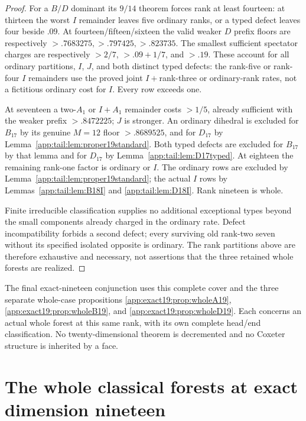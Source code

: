 \documentclass[11pt]{article}
\theoremstyle{definition}
\theoremstyle{remark}
\begin{document}
\begin{proof}
For a $B/D$ dominant its $9/14$ theorem forces rank at least
fourteen: at thirteen the worst $I$ remainder leaves five
ordinary ranks, or a typed defect leaves four beside $.09$.
At fourteen/fifteen/sixteen the valid weaker $D$ prefix
floors are respectively
$>.7683275,>.797425,>.823735$.
The smallest sufficient spectator charges are respectively
$>2/7$, $>.09+1/7$, and $>.19$.
These account for all ordinary partitions, $I$, $J$, and
both distinct typed defects: the rank-five or rank-four
$I$ remainders use the proved joint $I+$rank-three or
ordinary-rank rates, not a fictitious ordinary cost for $I$.
Every row exceeds one.

At seventeen a two-$A_1$ or $I+A_1$ remainder costs $>1/5$,
already sufficient with the weaker prefix $>.8472225$;
$J$ is stronger. An ordinary dihedral is excluded for
$B_{17}$ by its genuine $M=12$ floor $>.8689525$, and for
$D_{17}$ by Lemma~\ref{app:tail:lem:proper19standard}.
Both typed defects are excluded for $B_{17}$ by that lemma
and for $D_{17}$ by Lemma~\ref{app:tail:lem:D17typed}.
At eighteen the remaining rank-one factor is ordinary or
$I$. The ordinary rows are excluded by
Lemma~\ref{app:tail:lem:proper19standard}; the actual $I$
rows by Lemmas~\ref{app:tail:lem:B18I} and
\ref{app:tail:lem:D18I}. Rank nineteen is whole.

Finite irreducible classification supplies no additional
exceptional types beyond the small components already charged
in the ordinary rate. Defect incompatibility forbids a second
defect; every surviving old rank-two seven without its specified
isolated opposite is ordinary. The rank partitions above are
therefore exhaustive and necessary, not assertions that the
three retained whole forests are realized.
\end{proof}

The final exact-nineteen conjunction uses this complete cover and
the three separate whole-case propositions
\ref{app:exact19:prop:wholeA19},
\ref{app:exact19:prop:wholeB19}, and
\ref{app:exact19:prop:wholeD19}.
Each concerns an actual whole forest at this same rank, with its
own complete head/end classification. No twenty-dimensional theorem
is decremented and no Coxeter structure is inherited by a face.

\section{The whole classical forests at exact dimension nineteen}
\label{app:exact19:wholeclassical}
\end{document}

